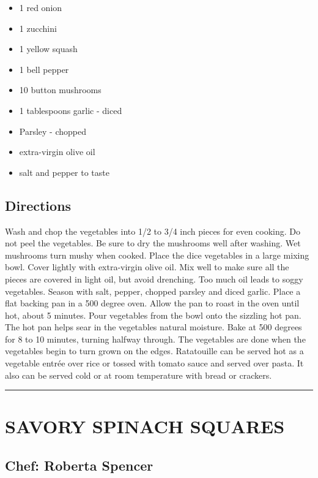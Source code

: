 \documentclass[
]{book}
\providecommand{\tightlist}{%
  \setlength{\itemsep}{0pt}\setlength{\parskip}{0pt}}
\begin{document}
\begin{itemize}
\tightlist
\item
  1 red onion
\item
  1 zucchini
\item
  1 yellow squash
\item
  1 bell pepper
\item
  10 button mushrooms
\item
  1 tablespoons garlic - diced
\item
  Parsley - chopped
\item
  extra-virgin olive oil
\item
  salt and pepper to taste
\end{itemize}

\hypertarget{directions-36}{%
\subsection*{Directions}\label{directions-36}}


Wash and chop the vegetables into 1/2 to 3/4 inch pieces for even cooking.
Do not peel the vegetables. Be sure to dry the mushrooms well after washing.
Wet mushrooms turn mushy when cooked. Place the dice vegetables in a large mixing bowl.
Cover lightly with extra-virgin olive oil. Mix well to make sure all the pieces are covered in
light oil, but avoid drenching. Too much oil leads to soggy vegetables. Season with salt, pepper,
chopped parsley and diced garlic. Place a flat backing pan in a 500 degree oven.
Allow the pan to roast in the oven until hot, about 5 minutes. Pour vegetables from the bowl onto
the sizzling hot pan. The hot pan helps sear in the vegetables natural moisture. Bake at 500 degrees
for 8 to 10 minutes, turning halfway through. The vegetables are done when the vegetables begin to turn grown on the edges.
Ratatouille can be served hot as a vegetable entrée over rice or tossed with
tomato sauce and served over pasta. It also can be served cold or at room temperature with bread or crackers.

\begin{center}\rule{0.5\linewidth}{0.5pt}\end{center}

\hypertarget{savory-spinach-squares}{%
\section*{SAVORY SPINACH SQUARES}\label{savory-spinach-squares}}


\hypertarget{chef-roberta-spencer-11}{%
\subsection*{Chef: Roberta Spencer}\label{chef-roberta-spencer-11}}
\end{document}
